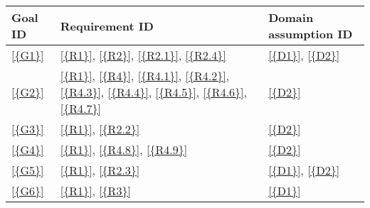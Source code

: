 \begin{table}[H]
      \centering
      \begin{tabular}{|l|p{8cm}|p{5cm}|}
            \hline
            \textbf{Goal ID} & \textbf{Requirement ID}                                                                                                                                                                                                      & \textbf{Domain assumption ID}                                                      \\\hline
            \ref{{G1}}       & \ref{{R1}}, \ref{{R2}}, \ref{{R2.1}}, \ref{{R2.4}}                                                                                                                                                                           & \ref{{D1}}, \ref{{D2}}                                                             \\\hline
            \ref{{G2}}       & \ref{{R1}}, \ref{{R4}}, \ref{{R4.1}}, \ref{{R4.2}}, \ref{{R4.3}}, \ref{{R4.4}}, \ref{{R4.5}}, \ref{{R4.6}}, \ref{{R4.7}}                                                                                                     & \ref{{D2}}                                                                         \\\hline
            \ref{{G3}}       & \ref{{R1}}, \ref{{R2.2}}                                                                                                                                                                                                     & \ref{{D2}}                                                                         \\\hline
            \ref{{G4}}       & \ref{{R1}}, \ref{{R4.8}}, \ref{{R4.9}}                                                                                                                                                                                       & \ref{{D2}}                                                                         \\\hline
            \ref{{G5}}       & \ref{{R1}}, \ref{{R2.3}}                                                                                                                                                                                                     & \ref{{D1}}, \ref{{D2}}                                                             \\\hline
            \ref{{G6}}       & \ref{{R1}}, \ref{{R3}}                                                                                                                                                                                                       & \ref{{D1}}                                                                         \\\hline

\end{tabular}
\end{table}
